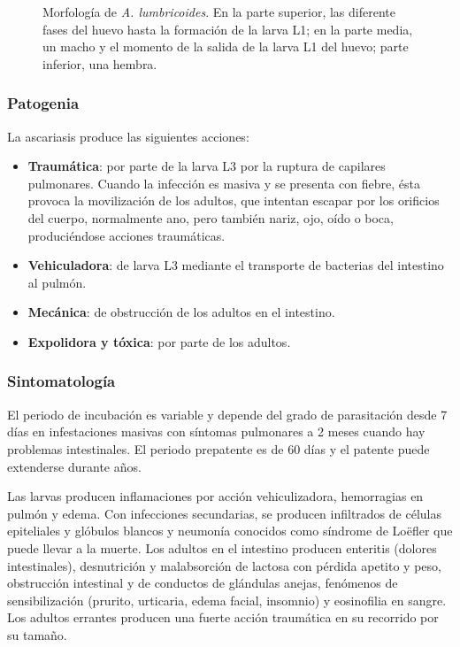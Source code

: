 \begin{multicols}{2}
\begin{figure}[H]
		\caption[Morfología de \textit{A. lumbricoides}]{Morfología de \textit{A. lumbricoides}. En la parte superior, las diferente fases del huevo hasta la formación de la larva L1; en la parte media, un macho y el momento de la salida de la larva L1 del huevo; parte inferior, una hembra.\label{fig:PARASIT:AlumbricoidesMorf}}
	\end{figure}
\end{multicols}
\subsubsection{Patogenia}
La ascariasis produce las siguientes acciones:
\begin{itemize}[itemsep=0pt,parsep=0pt,topsep=0pt,partopsep=0pt]
	\item\textbf{Traumática}: por parte de la larva L3 por la ruptura de capilares pulmonares. Cuando la infección es masiva y se presenta con fiebre, ésta provoca la movilización de los adultos, que intentan escapar por los orificios del cuerpo, normalmente ano, pero también nariz, ojo, oído o boca, produciéndose acciones traumáticas.
	\item\textbf{Vehiculadora}: de larva L3 mediante el transporte de bacterias del intestino al pulmón.
	\item\textbf{Mecánica}: de obstrucción de los adultos en el intestino.
	\item\textbf{Expolidora y tóxica}: por parte de los adultos.
\end{itemize}
\subsubsection{Sintomatología}
El periodo de incubación es variable y depende del grado de parasitación desde 7 días en infestaciones masivas con síntomas pulmonares a 2 meses cuando hay problemas intestinales. El periodo prepatente es de 60 días y el patente puede extenderse durante años.

Las larvas producen inflamaciones por acción vehiculizadora, hemorragias en pulmón y edema. Con infecciones secundarias, se producen infiltrados de células epiteliales y glóbulos blancos y neumonía conocidos como síndrome de Loëfler que puede llevar a la muerte. Los adultos en el intestino producen enteritis (dolores intestinales), desnutrición y malabsorción de lactosa con pérdida apetito y peso, obstrucción intestinal y de conductos de glándulas anejas, fenómenos de sensibilización (prurito, urticaria, edema facial, insomnio) y eosinofilia en sangre. Los adultos errantes producen una fuerte acción traumática en su recorrido por su tamaño.
